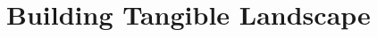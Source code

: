 \documentclass[final,3p,times,twocolumn]{elsarticle}
\begin{document}
\appendix
\section{Building Tangible Landscape}


% 
 
% 
% 
% 
% 
% 
% 
% 
% 
% 
% 
% 


\end{document}

